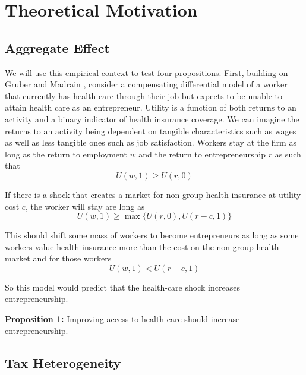 \documentclass[12pt]{article}
\begin{document}
\begin{comment}

Another concern is whether the stable unit treatment value assumption (SUTVA) holds. It can fail if for example entrepreneurs moved from Rhode Island to Massachusetts to take advantage of the health reform. If this occurs, we expect our results to be biased upwards. We believe our use of synthetic controls based on counties across the US helps isolates us from violations since any mobility . 

\end{comment}

\section{Theoretical Motivation}
\label{sec:model}

\subsection{Aggregate Effect}

We will use this empirical context to test four propositions. First, building on Gruber and Madrain \cite{gm2002}, consider a compensating differential model of a worker that currently has health care through their job but expects to be unable to attain health care as an entrepreneur. Utility is a function of both returns to an activity and a binary indicator of health insurance coverage. We can imagine the returns to an activity being dependent on tangible characteristics such as wages as well as less tangible ones such as job satisfaction. Workers stay at the firm as long as the return to employment $w$ and the return to entrepreneurship $r$ as such that
$$U(w,1) \ge U(r,0)$$

If there is a shock that creates a market for non-group health insurance at utility cost $c$, the worker will stay are long as
$$U(w,1) \ge \max\{U(r,0),U(r-c,1)\}$$

This should shift some mass of workers to become entrepreneurs as long as some workers value health insurance more than the cost on the non-group health market and for those workers
$$U(w,1) < U(r-c,1)$$

So this model would predict that the health-care shock increases entrepreneurship. 

\textbf{Proposition 1:} 
Improving access to health-care should increase entrepreneurship. 

\subsection{Tax Heterogeneity}
\end{document}
